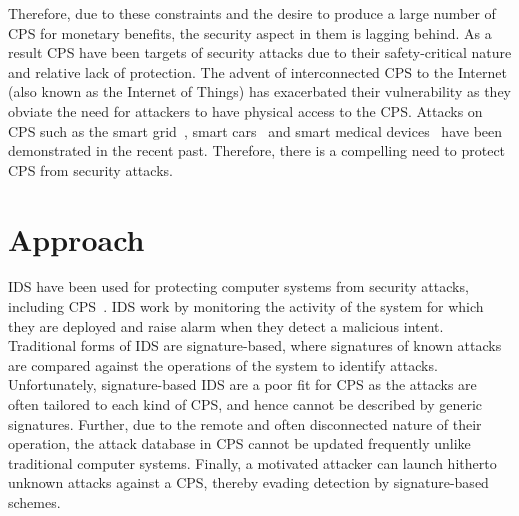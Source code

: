 Therefore, due to these constraints and the desire to produce a large number of \ac{CPS} for monetary benefits, the security aspect in them is lagging behind. As a result CPS have been targets of security attacks due to their safety-critical nature and relative lack of protection. The advent of interconnected \ac{CPS} to the Internet (also known as the Internet of Things) has exacerbated their vulnerability as they obviate the need for attackers to have physical access to the \ac{CPS}. Attacks on \ac{CPS} such as the smart grid~\cite{skopik2012survey, liu2012cyber}, smart cars~\cite{checkoway2011comprehensive, woo2015practical} and smart medical devices~\cite{leavitt2010researchers, radcliffe2011hacking} have been demonstrated in the recent past. 
Therefore, there is a compelling need to protect \ac{CPS} from security attacks. 

\section{Approach}
\label{sec:Approach}

\ac{IDS} have been used for protecting computer systems from security attacks, including CPS~\cite{lu2015towards, mitchell2015behavior, bernieri2016testbed}. \ac{IDS} work by monitoring the activity of the system for which they are deployed and raise alarm when they detect a malicious intent. Traditional forms of \ac{IDS} are signature-based, where signatures of known attacks are compared against the operations of the system to identify attacks. Unfortunately, signature-based \ac{IDS} are a poor fit for \ac{CPS} as the attacks are often tailored to each kind of \ac{CPS}, and hence cannot be described by generic signatures. Further, due to the remote and often disconnected nature of their operation, the attack database in \ac{CPS} cannot be updated frequently unlike traditional computer systems. Finally, a motivated attacker can launch hitherto unknown attacks against a \ac{CPS}, thereby evading detection by signature-based schemes. 

